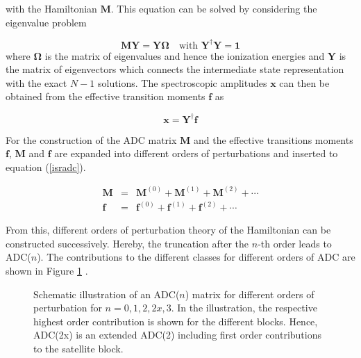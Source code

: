 with the Hamiltonian $\mathbf{M}$.
This equation can be solved by
considering the eigenvalue problem

\begin{equation}\label{adcewp}
\mathbf{M} \mathbf{Y} = \mathbf{Y}\mathbf{\Omega} \quad\text{with } \mathbf{Y}^\dagger\mathbf{Y}=\mathbf{1}
\end{equation}
where $\mathbf{\Omega}$ is the matrix of eigenvalues and hence the ionization
energies and $\mathbf{Y}$ is the matrix of eigenvectors which connects the
intermediate state representation with the exact $N-1$ solutions.
The spectroscopic amplitudes $\mathbf{x}$ can then be obtained from the
effective transition moments $\mathbf{f}$ as

\begin{equation}
 \mathbf{x} = \mathbf{Y}^\dagger \mathbf{f}
\end{equation}

For the construction of the \ac{ADC} matrix $\mathbf{M}$ and the
effective transitions moments $\mathbf{f}$, $\mathbf{M}$ and $\mathbf{f}$
are expanded into different orders of perturbations and inserted to equation
(\ref{isradc}).

\begin{eqnarray}
\mathbf{M} &=& \mathbf{M}^{(0)} + \mathbf{M}^{(1)} + \mathbf{M}^{(2)} + \cdots\label{stf}\\
\mathbf{f} &=& \mathbf{f}^{(0)} + \mathbf{f}^{(1)} + \mathbf{f}^{(2)} + \cdots\label{stf}
\end{eqnarray}

From this, different orders of perturbation theory of the Hamiltonian can be
constructed successively. Hereby, the truncation after the $n$-th order leads
to ADC($n$). The contributions to the different classes for different
orders of \ac{ADC} are shown
in Figure \ref{figure:adcmat_pgf} \cite{Trofimov05}.

\begin{figure}[h]
  \centering
  
  \caption{Schematic illustration of an \ac{ADC}($n$) matrix for different orders
           of perturbation for $n=0,1,2,2x,3$. In the illustration, the respective
           highest order contribution is shown for the different blocks.
           Hence, ADC(2x) is an extended ADC(2) including first
           order contributions to the satellite block.}
  \label{figure:adcmat_pgf}
\end{figure}


